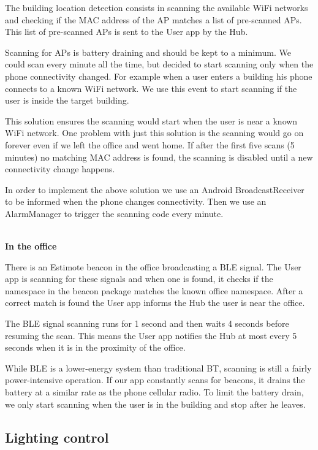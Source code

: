 The building location detection consists in scanning the available \ac{WiFi} networks and checking if the \ac{MAC} address of the \ac{AP} matches a list of pre-scanned \ac{AP}s. This list of pre-scanned \ac{AP}s is sent to the User app by the Hub.  

Scanning for \ac{AP}s is battery draining and should be kept to a minimum. We could scan every minute all the time, but decided to start scanning only when the phone connectivity changed. For example when a user enters a building his phone connects to a known \ac{WiFi} network. We use this event to start scanning if the user is inside the target building.


This solution ensures the scanning would start when the user is near a known \ac{WiFi} network. One problem with just this solution is the scanning would go on forever even if we left the office and went home. If after the first five scans (5 minutes) no matching \ac{MAC} address is found, the scanning is disabled until a new connectivity change happens. 


In order to implement the above solution we use an Android BroadcastReceiver to be informed when the phone changes connectivity. Then we use an AlarmManager to trigger the scanning code every minute.

\mbox{}\\
\textbf{In the office}

There is an Estimote beacon in the office broadcasting a \ac{BLE} signal. The User app is scanning for these signals and when one is found, it checks if the namespace in the beacon package matches the known office namespace. After a correct match is found the User app informs the Hub the user is near the office.

The \ac{BLE} signal scanning runs for 1 second and then waits 4 seconds before resuming the scan. This means the User app notifies the Hub at most every 5 seconds when it is in the proximity of the office.

While \ac{BLE} is a lower-energy system than traditional \ac{BT}, scanning is still a fairly power-intensive operation. If our app constantly scans for beacons, it drains the battery at a similar rate as the phone cellular radio. To limit the battery drain, we only start scanning when the user is in the building and stop after he leaves.

\subsection{Lighting control}\label{light_imp}


